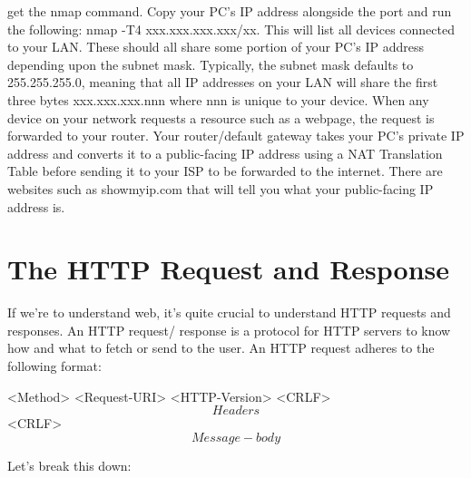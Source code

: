 \documentclass{article}
\begin{document}
get the nmap command. Copy your PC's IP address alongside the port and run the following:
nmap -T4 xxx.xxx.xxx.xxx/xx. This will list all devices connected to your LAN. These should all share some
portion of your PC's IP address depending upon the subnet mask. Typically, the subnet mask defaults to
255.255.255.0, meaning that all IP addresses on your LAN will share the first three bytes xxx.xxx.xxx.nnn where
nnn is unique to your device. When any device on your network requests a resource such as a webpage, the
request is forwarded to your router. Your router/default gateway takes your PC's private IP address and
converts it to a public-facing IP address using a NAT Translation Table before sending it to your ISP to be
forwarded to the internet. There are websites such as showmyip.com that will tell you what your public-facing
IP address is.

\section{The HTTP Request and Response}

If we're to understand web, it's quite crucial to understand HTTP requests and responses. An HTTP request/
response is a protocol for HTTP servers to know how and what to fetch or send to the user. An HTTP request
adheres to the following format:

<Method> <Request-URI> <HTTP-Version> <CRLF>\\
\[Headers\] <CRLF>\\
\[Message-body\]

Let's break this down:
\end{document}
